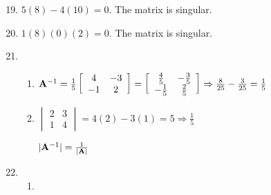\documentclass[12pt]{article}
\begin{document}
\begin{enumerate}
    \setcounter{enumi}{18}

  \item $5(8)-4(10)=0$. The matrix is singular.

    \setcounter{enumi}{22}

  \item $1(8)(0)(2)=0$. The matrix is singular.

    \setcounter{enumi}{24}

  \item

    \begin{enumerate}

      \item $\bold{A}^{-1}=\frac{1}{5}\left[ \begin{array}{cc} 4 & -3\\ -1 & 2  \end{array} \right]=\left[ \begin{array}{cc} \frac{4}{5} & -\frac{3}{5}\\ -\frac{1}{5} & \frac{2}{5}  \end{array} \right]\Rightarrow\frac{8}{25}-\frac{3}{25}=\frac{1}{5}$

      \item $\begin{vmatrix} 2 & 3\\ 1 & 4  \end{vmatrix}=4(2)-3(1)=5\Rightarrow \frac{1}{5}$

        \begin{center}
          $|\bold{A}^{-1}|=\frac{1}{|\bold{A}|}$ \checkmark
        \end{center}

    \end{enumerate}

    \setcounter{enumi}{28}

  \item 

    \begin{enumerate}

      \item 


\end{enumerate}
\end{enumerate}
\end{document}
